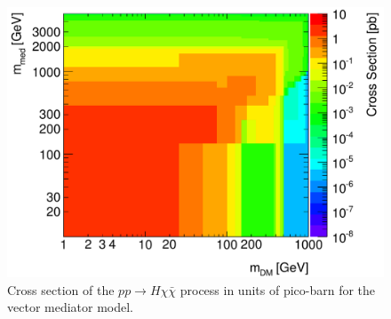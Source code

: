 \begin{figure}[hbpt!]
	\begin{center}
		\includegraphics[width=0.9\linewidth]{figures/EW/monoH/zprime_cross_section_new}
		\caption{ Cross section of the $pp \rightarrow H\chi\bar{\chi}$ process 
			in units of pico-barn for the vector mediator model. 
			\label{fig:zprimeXS}}
	\end{center}
\end{figure}


